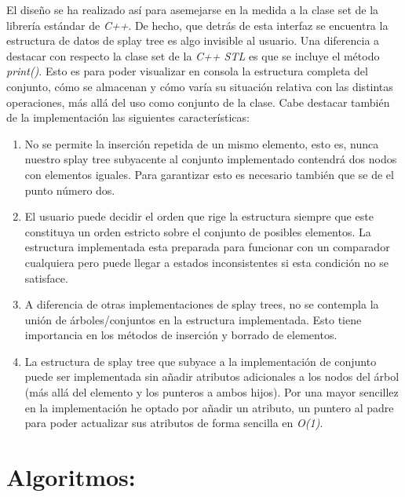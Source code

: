 \documentclass[letterpaper,12pt]{article}
\begin{document}
El diseño se ha realizado así para asemejarse en la medida a la clase set de
la librería estándar de \textit{C++}. De hecho, que detrás de esta interfaz
se encuentra la estructura de datos de splay tree es algo invisible al 
usuario. Una diferencia a destacar con respecto la clase set de la 
\textit{C++ STL} es que se incluye el método \textit{print()}. Esto es para
poder visualizar en consola la estructura completa del conjunto, cómo se
almacenan y cómo varía su situación relativa con las distintas operaciones, 
más allá del uso como conjunto de la clase. Cabe destacar también de la 
implementación las siguientes características:

\begin{enumerate}
\setlength{\parskip}{0mm}         %

\item No se permite la inserción repetida de un mismo elemento, esto es, 
      nunca nuestro splay tree subyacente al conjunto implementado contendrá
      dos nodos con elementos iguales. Para garantizar esto es necesario 
      también que se de el punto número dos.
\item El usuario puede decidir el orden que rige la estructura siempre que 
      este constituya un orden estricto sobre el conjunto de posibles 
      elementos. La estructura implementada esta preparada para funcionar con 
      un comparador cualquiera pero puede llegar a estados inconsistentes si 
      esta condición no se satisface.
\item A diferencia de otras implementaciones de splay trees, no se contempla
      la unión de árboles/conjuntos en la estructura implementada. Esto tiene
      importancia en los métodos de inserción y borrado de elementos.
\item La estructura de splay tree que subyace a la implementación de conjunto
      puede ser implementada sin añadir atributos adicionales a los nodos del
      árbol (más allá del elemento y los punteros a ambos hijos). Por una 
      mayor sencillez en la implementación he optado por añadir un atributo,
      un puntero al padre para poder actualizar sus atributos de forma 
      sencilla en \textit{O(1)}.
     
\end{enumerate}


\section{Algoritmos:}
\end{document}
